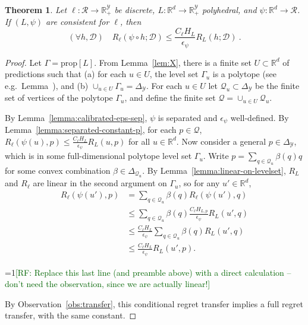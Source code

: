 \documentclass[11pt]{article}
\newcommand{\Comments}{1}
\newcommand{\mynote}[2]{\ifnum\Comments=1\textcolor{#1}{#2}\fi}
\newcommand{\raf}[1]{\mynote{darkgreen}{[RF: #1]}}
\newcommand{\reals}{\mathbb{R}}
\newcommand{\prop}[1]{\mathrm{prop}[#1]}
\newcommand{\simplex}{\Delta_\Y}
\newcommand{\D}{\mathcal{D}}
\newcommand{\R}{\mathcal{R}}
\newcommand{\Y}{\mathcal{Y}}
\newtheorem{theorem}{Theorem}
\begin{document}
\begin{theorem}\label{thm:separated-constant}
  Let $\ell: \R \to \reals_+^{\Y}$ be discrete, $L: \reals^d \to \reals_+^{\Y}$ polyhedral, and $\psi: \reals^d \to \R$.
  If $(L,\psi)$ are consistent for $\ell$, then
    \[ (\forall h,\D) \quad R_{\ell}(\psi \circ h ; \D) \leq \frac{C_{\ell} H_L}{\epsilon_{\psi}} R_L(h ; \D) ~. \]
\end{theorem}
\begin{proof}
  Let $\Gamma = \prop{L}$.
  From Lemma~\ref{lem:X}, there is a finite set $U \subset \reals^d$ of predictions such that (a) for each $u \in U$, the level set $\Gamma_u$ is a polytope (see e.g.\ Lemma~\label{lem:level-set-is-projected-face}), and (b) $\cup_{u \in U} \Gamma_u = \simplex$.
  For each $u\in U$ let $\mathcal{Q}_u \subset \simplex$ be the finite set of vertices of the polytope $\Gamma_u$, and define the finite set $\mathcal{Q} = \cup_{u \in U} \mathcal{Q}_u$.
  
  By Lemma~\ref{lemma:calibrated-eps-sep}, $\psi$ is separated and $\epsilon_{\psi}$ well-defined.
  By Lemma~\ref{lemma:separated-constant-p}, for each $p \in \mathcal{Q}$, $R_{\ell}(\psi(u),p) \leq \frac{C_{\ell} H_L}{\epsilon_{\psi}} R_L(u,p)$ for all $u\in\reals^d$.
  Now consider a general $p \in \simplex$, which is in some full-dimensional polytope level set $\Gamma_u$.
  Write $p = \sum_{q \in \mathcal{Q}_u} \beta(q) q$ for some convex combination $\beta \in \Delta_{\mathcal Q_u}$.
  By Lemma~\ref{lemma:linear-on-levelset}, $R_L$ and $R_{\ell}$ are linear in the second argument on $\Gamma_u$, so for any $u'\in\reals^d$,
  \begin{align*}
    R_{\ell}(\psi(u'),p)
    &=    \sum_{q \in \mathcal{Q}_u} \beta(q) R_{\ell}(\psi(u'), q)  \\
    &\leq \sum_{q \in \mathcal{Q}_u} \beta(q) \frac{C_{\ell} H_{L,p}}{\epsilon_{\psi}} R_L(u', q)  \\
    &\leq \frac{C_{\ell} H_L}{\epsilon_{\psi}} \sum_{q \in \mathcal{Q}_u} \beta(q) R_L(u', q)  \\
    &\leq \frac{C_{\ell} H_L}{\epsilon_{\psi}} R_L(u', p) .
  \end{align*}

  \raf{Replace this last line (and preamble above) with a direct calculation -- don't need the observation, since we are actually linear!}

  By Observation~\ref{obs:transfer}, this conditional regret transfer implies a full regret transfer, with the same constant.
\end{proof}
\end{document}
